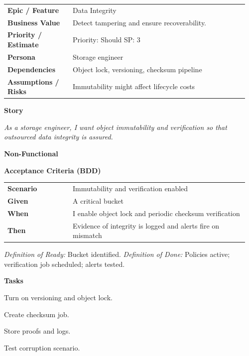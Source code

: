 \documentclass[11pt,letterpaper]{article}
\makeatletter
\newenvironment{kvtable}{%
  \par\noindent\begin{tabular}{@{}>{\raggedright\bfseries\arraybackslash}p{0.26\linewidth} >{\raggedright\arraybackslash}p{0.70\linewidth}@{}}
}{\end{tabular}\par}
\newenvironment{bdd}{%
  \par\noindent\begin{tabular}{@{}>{\raggedright\bfseries\arraybackslash}p{0.26\linewidth} >{\raggedright\arraybackslash}p{0.70\linewidth}@{}}
}{\end{tabular}\par}
\newcommand{\DoRDoD}[2]{%
  \vspace{0.35em}
  {\footnotesize\color{Muted}%
    \textit{Definition of Ready:} #1 \; \textbullet\;
    \textit{Definition of Done:} #2%
  }%
}
\newenvironment{storycard}[2]{%
  \begin{tcolorbox}[cloudcard, title={#1 --- #2}]%
}{\end{tcolorbox}}
\newcommand{\sectionlabel}[1]{\par\vspace{0.35em}\textbf{#1}\par}
\makeatother
\begin{document}
\begin{storycard}{CCS-21}{Ch. 21 — Integrity Assurance for Data Outsourcing}
\begin{kvtable}
Epic / Feature & Data Integrity\\
Business Value & Detect tampering and ensure recoverability.\\
Priority / Estimate & Priority: Should \quad SP: 3\\
Persona & Storage engineer\\
Dependencies & Object lock, versioning, checksum pipeline\\
Assumptions / Risks & Immutability might affect lifecycle costs\\
\end{kvtable}
\sectionlabel{Story}
\textit{As a storage engineer, I want object immutability and verification so that outsourced data integrity is assured.}
\sectionlabel{Non-Functional}\;
\sectionlabel{Acceptance Criteria (BDD)}
\begin{bdd}
Scenario & Immutability and verification enabled\\
Given & A critical bucket\\
When & I enable object lock and periodic checksum verification\\
Then & Evidence of integrity is logged and alerts fire on mismatch\\
\end{bdd}
\DoRDoD{Bucket identified.}{Policies active; verification job scheduled; alerts tested.}
\sectionlabel{Tasks}
\begin{checklist}
\item Turn on versioning and object lock.
\item Create checksum job.
\item Store proofs and logs.
\item Test corruption scenario.
\end{checklist}
\end{storycard}
\end{document}
